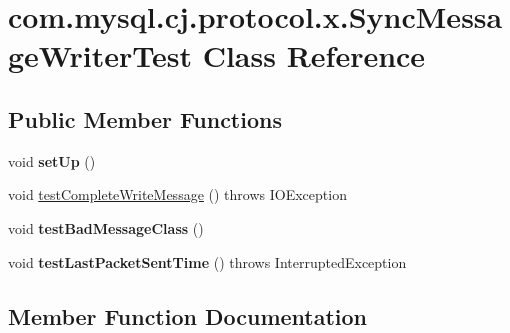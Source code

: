 \hypertarget{classcom_1_1mysql_1_1cj_1_1protocol_1_1x_1_1_sync_message_writer_test}{}\section{com.\+mysql.\+cj.\+protocol.\+x.\+Sync\+Message\+Writer\+Test Class Reference}
\label{classcom_1_1mysql_1_1cj_1_1protocol_1_1x_1_1_sync_message_writer_test}
\subsection*{Public Member Functions}
\begin{DoxyCompactItemize}
\item 
\mbox{\label{classcom_1_1mysql_1_1cj_1_1protocol_1_1x_1_1_sync_message_writer_test_a001c1ad2ec3d7f04da2c59a5943e5a47}} 
void {\bfseries set\+Up} ()
\item 
void \mbox{\hyperlink{classcom_1_1mysql_1_1cj_1_1protocol_1_1x_1_1_sync_message_writer_test_a7aaa9068fcf93ad8d5803c540e475e24}{test\+Complete\+Write\+Message}} ()  throws I\+O\+Exception 
\item 
\mbox{\label{classcom_1_1mysql_1_1cj_1_1protocol_1_1x_1_1_sync_message_writer_test_ac1d9da94da97bb96aeb1d2ba37a49724}} 
void {\bfseries test\+Bad\+Message\+Class} ()
\item 
\mbox{\label{classcom_1_1mysql_1_1cj_1_1protocol_1_1x_1_1_sync_message_writer_test_aebc9123f8eeb266d9db25750787c97b2}} 
void {\bfseries test\+Last\+Packet\+Sent\+Time} ()  throws Interrupted\+Exception 
\end{DoxyCompactItemize}


\subsection{Member Function Documentation}
\mbox{\label{classcom_1_1mysql_1_1cj_1_1protocol_1_1x_1_1_sync_message_writer_test_a7aaa9068fcf93ad8d5803c540e475e24}} 
